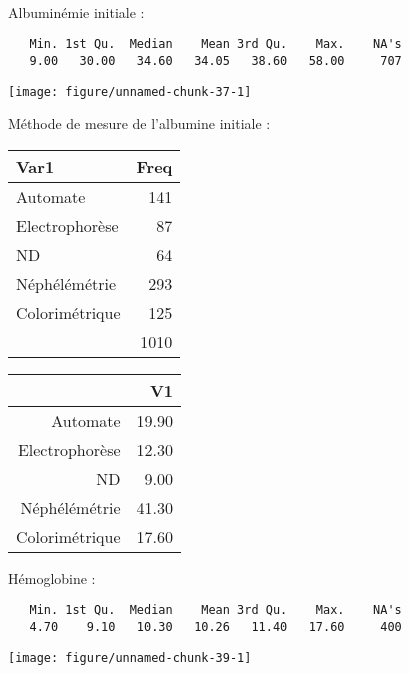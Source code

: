 \documentclass[11pt,a4paper]{article}\usepackage[]{graphicx}\usepackage[]{color}
\makeatletter
\def\maxwidth{ %
  \ifdim\Gin@nat@width>\linewidth
    \linewidth
  \else
    \Gin@nat@width
  \fi
}
\newenvironment{kframe}{%
 \def\at@end@of@kframe{}%
 \ifinner\ifhmode%
  \def\at@end@of@kframe{\end{minipage}}%
  \begin{minipage}{\columnwidth}%
 \fi\fi%
 \def\FrameCommand##1{\hskip\@totalleftmargin \hskip-\fboxsep
 \colorbox{shadecolor}{##1}\hskip-\fboxsep
     \hskip-\linewidth \hskip-\@totalleftmargin \hskip\columnwidth}%
 \MakeFramed {\advance\hsize-\width
   \@totalleftmargin\z@ \linewidth\hsize
   \@setminipage}}%
 {\par\unskip\endMakeFramed%
 \at@end@of@kframe}
\newenvironment{knitrout}{}{} %
\makeatother
\begin{document}
~\\

Albuminémie initiale :


\begin{knitrout}
\color{fgcolor}\begin{kframe}
\begin{verbatim}
   Min. 1st Qu.  Median    Mean 3rd Qu.    Max.    NA's 
   9.00   30.00   34.60   34.05   38.60   58.00     707 
\end{verbatim}
\end{kframe}
\texttt{[image: figure/unnamed-chunk-37-1]} 

\end{knitrout}

Méthode de mesure de l'albumine initiale :

\begin{table}[H]
\centering
\begin{tabular}{lr}
  \hline
Var1 & Freq \\ 
  \hline
Automate & 141 \\ 
  Electrophorèse &  87 \\ 
  ND &  64 \\ 
  Néphélémétrie & 293 \\ 
  Colorimétrique  & 125 \\ 
   & 1010 \\ 
   \hline
\end{tabular}
\end{table}
\begin{table}[H]
\centering
\begin{tabular}{rr}
  \hline
 & V1 \\ 
  \hline
Automate & 19.90 \\ 
  Electrophorèse & 12.30 \\ 
  ND & 9.00 \\ 
  Néphélémétrie & 41.30 \\ 
  Colorimétrique  & 17.60 \\ 
   \hline
\end{tabular}
\end{table}


Hémoglobine :

\begin{knitrout}
\color{fgcolor}\begin{kframe}
\begin{verbatim}
   Min. 1st Qu.  Median    Mean 3rd Qu.    Max.    NA's 
   4.70    9.10   10.30   10.26   11.40   17.60     400 
\end{verbatim}
\end{kframe}
\texttt{[image: figure/unnamed-chunk-39-1]} 

\end{knitrout}
\end{document}
